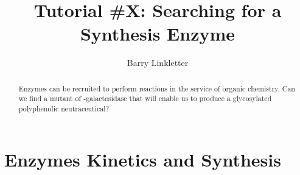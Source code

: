\documentclass[]{tufte-handout}
\title{Tutorial \#X: Searching for a Synthesis Enzyme}
\author[Barry Linkletter]{Barry Linkletter}
\date{} %
\begin{document}
\justifying


\maketitle%

\begin{abstract}
\noindent Enzymes can be recruited to perform reactions in the service of organic chemistry. Can we find a mutant of \textbeta -galactosidase that will enable us to produce a glycosylated polyphenolic neutraceutical?

\end{abstract}





\section{Enzymes Kinetics and Synthesis}
\end{document}
